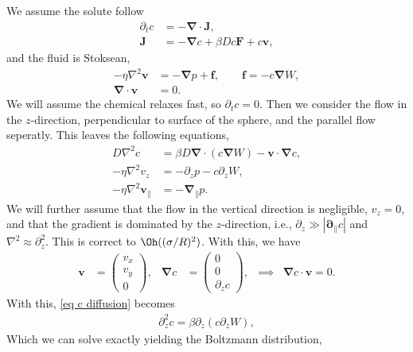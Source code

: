 We assume the solute follow
%
\begin{align}
    \partial_t c &= - \bm \nabla \cdot \bm J,\\
    \bm J &= - \bm \nabla c + \beta D c \bm F + c \bm v,
\end{align}
%
and the fluid is Stoksean,
%
\begin{align}
    - \eta \nabla^2 \bm v &= - \bm \nabla p + \bm f, \quad\quad \bm f = - c \bm \nabla W,\\
    \bm \nabla \cdot \bm v &= 0.
\end{align}
%
We will assume the chemical relaxes fast, so $\partial_t c = 0$.
Then we consider the flow in the $z$-direction, perpendicular to surface of the sphere, and the parallel flow seperatly.
This leaves the following equations,
%
\begin{subequations}
\begin{align}\label{eq c diffusion}
    D \nabla^2 c &= \beta D \bm \nabla \cdot (c \bm \nabla W) - \bm v \cdot \bm \nabla c,\\\label{eq vz}
    - \eta \nabla^2 v_z &= - \partial_z p - c \partial_z W, \\\label{eq v par}
    - \eta \nabla^2 \bm v_\parallel & = - \bm \nabla_\parallel p.
\end{align}    
\end{subequations}
%
We will further assume that the flow in the vertical direction is negligible, $v_z = 0$, and that the gradient is dominated by the $z$-direction, i.e., $\partial_z \gg |\bm \partial_\parallel c|$ and $\nabla^2 \approx \partial_z^2$.
This is correct to $\Oh((\sigma/R)^2)$.
With this, we have
%
\begin{align}
    \bm v &=
    \begin{pmatrix}
        v_x \\ v_y \\ 0
    \end{pmatrix},&
    \bm \nabla c
    &= 
    \begin{pmatrix}
        0 \\ 0 \\ \partial_z c
    \end{pmatrix}, &\implies &
    \bm \nabla c \cdot \bm v = 0.
\end{align} 
%
With this, \autoref{eq c diffusion} becomes
%
\begin{align}
    \partial_z^2 c = \beta \partial_z \left(c \partial_z W\right),
\end{align}
%
Which we can solve exactly yielding the Boltzmann distribution,
